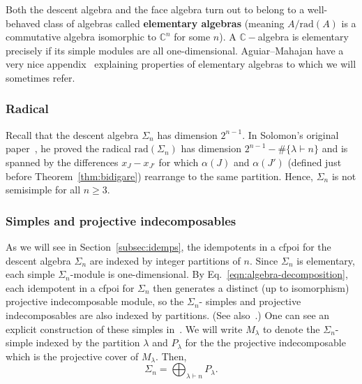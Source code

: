 \documentclass[ALCO, Unicode]{cedram}
\def\rad{\mathrm{rad}}
\def\C{{\mathbb{C}}}
\begin{document}
 Both the descent algebra and the face algebra turn out to belong to a well-behaved class of algebras called \textbf{elementary algebras} (meaning $A / \rad(A)$ is a commutative algebra isomorphic to $\C^n$ for some $n$). A $\C-$algebra is elementary precisely if its simple modules are all one-dimensional. Aguiar--Mahajan have a very nice appendix~\cite[Appendix D.8]{Aguiar-Mahajan} explaining properties of elementary algebras to which we will sometimes refer.

\subsubsection{Radical} 
Recall that the descent algebra $\Sigma_n$ has dimension $2^{n - 1}.$ In Solomon's original paper~\cite{Solomondescentbirth}, he proved the radical $\rad(\Sigma_n)$ has dimension $2^{n - 1} - \# \{\lambda \vdash n\}$ and is spanned by the differences $x_J - x_{J'}$ for which $\alpha(J)$ and $\alpha(J')$ (defined just before Theorem~\ref{thm:bidigare}) rearrange to the same partition. Hence, $\Sigma_n$ is not semisimple for all $n \geq 3.$
 
\subsubsection{Simples and projective indecomposables }
As we will see in Section~\ref{subsec:idemps}, the idempotents in a cfpoi for the descent algebra $\Sigma_n$ are indexed by integer partitions of $n$. Since $\Sigma_n$ is elementary, each simple $\Sigma_n$-module is one-dimensional. By Eq.~\eqref{eqn:algebra-decomposition}, each idempotent in a cfpoi for $\Sigma_n$ then generates a distinct (up to isomorphism) projective indecomposable module, so the $\Sigma_n$- simples and projective indecomposables are also indexed by partitions. (See also~\cite[Theorem D.35]{Aguiar-Mahajan}.) One can see an explicit construction of these simples in~\cite[\S 3]{atkinson}. 
We will write \textbf{${M_\lambda}$} to denote the $\Sigma_n$-simple indexed by the partition $\lambda$ and  \textbf{$P_\lambda$} for the the projective indecomposable which is the projective cover of $M_\lambda.$  Then, \[\Sigma_n = \bigoplus_{\lambda \vdash n}P_\lambda.\] 
\end{document}
